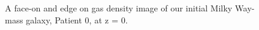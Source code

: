 \documentclass[]{emulateapj}
\begin{document}
\begin{figure}[]
\vspace{-2mm}
\centerline{}
\vspace{0mm}
\centerline{}
\caption[]{A face-on and edge on gas density image of our initial Milky Way-mass galaxy, Patient 0, at z = 0.}
\label{fig-P0}
\end{figure}
\end{document}
